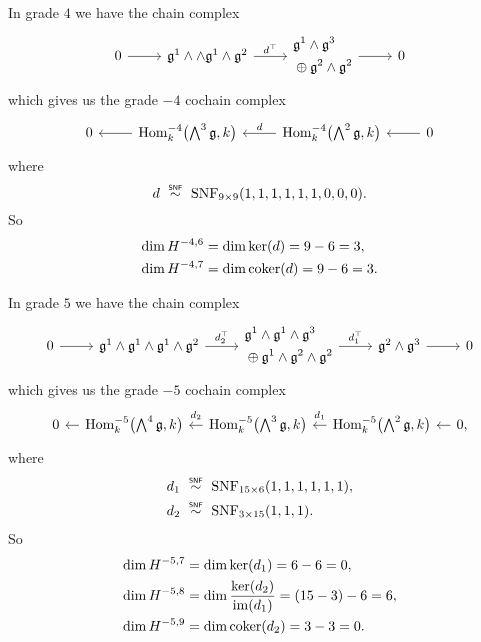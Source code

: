 In grade $4$ we have the chain complex
\[
  \begin{tikzcd}[ampersand replacement=\&]
    0 \ar[r] \& \lie{g}^{1} \wedge \wedge \lie{g}^{1} \wedge \lie{g}^{2} \ar[r,"d^{\top}"] \& \begin{aligned} &\lie{g}^{1} \wedge \lie{g}^{3} \\ &\oplus \lie{g}^{2} \wedge \lie{g}^{2} \end{aligned} \ar[r] \& 0
  \end{tikzcd}
\]
which gives us the grade $-4$ cochain complex
\[
  \begin{tikzcd}
    0 & \ar[l] \Hom_{k}^{-4}\bigl( \bigwedge^{3}\lie{g}, k \bigr) & \ar[l,"d"'] \Hom_{k}^{-4}\bigl( \bigwedge^{2}\lie{g}, k \bigr) &  \ar[l] 0
  \end{tikzcd}
\]
where
\begin{equation*}
  d \snfsim \SNF_{9\times9}(1,1,1,1,1,1,0,0,0).
\end{equation*}
So
\begin{align*}
  \dim H^{-4,6} &= \dim \operatorname{ker}(d) = 9-6 = 3, \\
  \dim H^{-4,7} &= \dim \operatorname{coker}(d) = 9-6 = 3.
\end{align*}

In grade $5$ we have the chain complex
\[
  \begin{tikzcd}[ampersand replacement=\&]
    0 \ar[r] \& \lie{g}^{1} \wedge \lie{g}^{1} \wedge \lie{g}^{1} \wedge \lie{g}^{2} \ar[r,"d_{2}^{\top}"] \& \begin{aligned} &\lie{g}^{1} \wedge \lie{g}^{1} \wedge \lie{g}^{3} \\ &\oplus \lie{g}^{1} \wedge \lie{g}^{2} \wedge \lie{g}^{2} \end{aligned} \ar[r,"d_{1}^{\top}"] \& \lie{g}^{2} \wedge \lie{g}^{3} \ar[r] \& 0
  \end{tikzcd}
\]
which gives us the grade $-5$ cochain complex
\[
  \begin{tikzcd}[column sep=1em]
    0 & \ar[l] \Hom_{k}^{-5}\bigl( \bigwedge^{4}\lie{g}, k \bigr) & \ar[l,"d_{2}"' {yshift=2pt}] \Hom_{k}^{-5}\bigl( \bigwedge^{3}\lie{g}, k \bigr) & \ar[l,"d_{1}"' {yshift=2pt}] \Hom_{k}^{-5}\bigl( \bigwedge^{2}\lie{g}, k \bigr) & \ar[l] 0,
  \end{tikzcd}
\]
where
\begin{align*}
  d_{1} &\snfsim \SNF_{15\times6}(1,1,1,1,1,1), \\
  d_{2} &\snfsim \SNF_{3\times15}(1,1,1).
\end{align*}
So
\begin{align*}
  \dim H^{-5,7} &= \dim \operatorname{ker}(d_{1}) = 6-6 = 0, \\
  \dim H^{-5,8} &= \dim \dfrac{\operatorname{ker}(d_{2})}{\operatorname{im}(d_{1})} = (15-3) - 6 = 6, \\
  \dim H^{-5,9} &= \dim \operatorname{coker}(d_{2}) = 3 - 3 = 0.
\end{align*}

